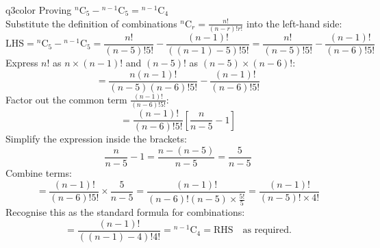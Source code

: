 \documentclass[11pt,a4paper]{article}
\newcommand{\ncr}[2]{{}^{#1}\mathrm{C}_{#2}}
\begin{document}
\begin{ansbox}{q3color}
Proving ${}^n\mathrm{C}_5 - {}^{n-1}\mathrm{C}_5 = {}^{n-1}\mathrm{C}_4$\\[4pt]
Substitute the definition of combinations $\ncr{n}{r} = \frac{n!}{(n-r)!r!}$ into the left-hand side:
\[
\text{LHS} = {}^n\mathrm{C}_5 - {}^{n-1}\mathrm{C}_5 = \frac{n!}{(n-5)!5!} - \frac{(n-1)!}{((n-1)-5)!5!} = \frac{n!}{(n-5)!5!} - \frac{(n-1)!}{(n-6)!5!}
\]
Express $n!$ as $n \times (n-1)!$ and $(n-5)!$ as $(n-5) \times (n-6)!$:
\[
= \frac{n(n-1)!}{(n-5)(n-6)!5!} - \frac{(n-1)!}{(n-6)!5!}
\]
Factor out the common term $\frac{(n-1)!}{(n-6)!5!}$:
\[
= \frac{(n-1)!}{(n-6)!5!} \left[ \frac{n}{n-5} - 1 \right]
\]
Simplify the expression inside the brackets:
\[
\frac{n}{n-5} - 1 = \frac{n - (n-5)}{n-5} = \frac{5}{n-5}
\]
Combine terms:
\[
= \frac{(n-1)!}{(n-6)!5!} \times \frac{5}{n-5} = \frac{(n-1)!}{(n-6)!(n-5) \times \frac{5!}{5}} = \frac{(n-1)!}{(n-5)! \times 4!}
\]
Recognise this as the standard formula for combinations:
\[
= \frac{(n-1)!}{((n-1)-4)!4!} = {}^{n-1}\mathrm{C}_4 = \text{RHS} \quad \text{as required.}
\]
\end{ansbox}
\end{document}
